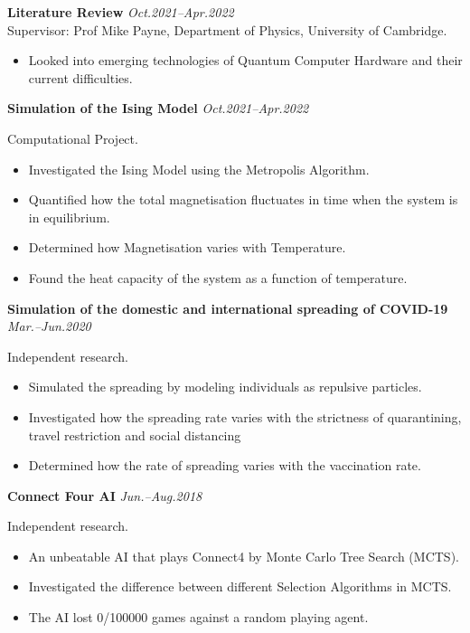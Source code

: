 \documentclass[11pt,a4paper,roman]{moderncv}        %
\begin{document}
\textbf{Literature Review} \hfill \textit{Oct.2021--Apr.2022}
\vspace*{1mm}\\
{Supervisor: Prof Mike Payne, Department of Physics, University of Cambridge.}
\vspace*{1mm}
\begin{itemize}
    \item Looked into emerging technologies of Quantum Computer Hardware and their current difficulties.\\
\end{itemize}

\textbf{Simulation of the Ising Model} \hfill \textit{Oct.2021--Apr.2022} 
\vspace*{1mm}\\ 
{
Computational Project.
\vspace*{1mm}
\begin{itemize}
	\item Investigated the Ising Model using the Metropolis Algorithm.
    \item Quantified how the total magnetisation fluctuates in time when the system is in equilibrium.
    \item Determined how Magnetisation varies with Temperature.
    \item Found the heat capacity of the system as a function of temperature.\\
\end{itemize}
}

\textbf{Simulation of the domestic and international spreading of COVID-19} \hfill \textit{Mar.--Jun.2020} 
\vspace*{1mm}\\
{
Independent research.
\vspace*{1mm}
\begin{itemize}
	\item Simulated the spreading by modeling individuals as repulsive particles.
    \item Investigated how the spreading rate varies with the strictness of quarantining, travel restriction and  social distancing
    \item Determined how the rate of spreading varies with the vaccination rate.\\
\end{itemize}
}

\textbf{Connect Four AI} \hfill \textit{Jun.--Aug.2018} 
\vspace*{1mm}\\
{
Independent research.
\vspace*{1mm}
\begin{itemize}
	\item An unbeatable AI that plays Connect4 by Monte Carlo Tree Search (MCTS).
	\item Investigated the difference between different Selection Algorithms in MCTS.
    \item The AI lost 0/100000 games against a random playing agent.
\end{itemize}
}
\end{document}
